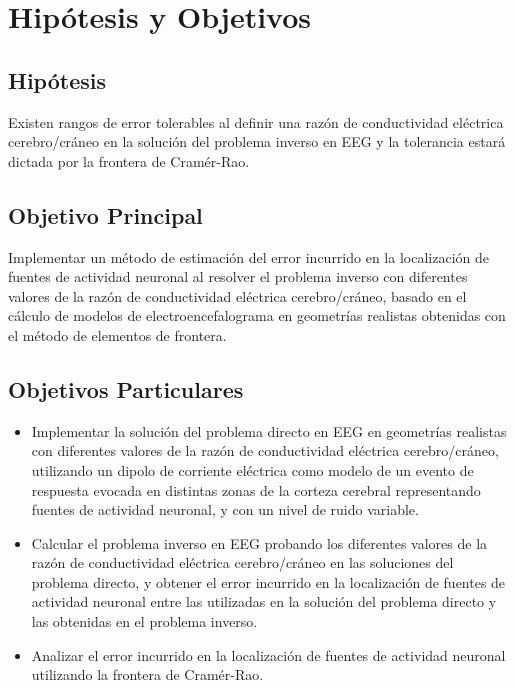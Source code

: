 %
\chapter{Hipótesis y Objetivos}
\label{sec:obj}

\section{Hipótesis}
\label{sec:obj:hipotesis}

Existen rangos de error tolerables al definir una razón de conductividad eléctrica cerebro/cráneo en la solución del problema inverso en EEG y la tolerancia estará dictada por la frontera de Cramér-Rao.

\section{Objetivo Principal}
\label{sec:obj:main}

Implementar un método de estimación del error incurrido en la localización de fuentes de actividad neuronal al resolver el problema inverso con diferentes valores de la razón de conductividad eléctrica cerebro/cráneo, basado en el cálculo de modelos de electroencefalograma en geometrías realistas obtenidas con el método de elementos de frontera.

\section{Objetivos Particulares}
\label{sec:obj:individual}

\begin{itemize}
	\item Implementar la solución del problema directo en EEG en geometrías realistas con diferentes valores de la razón de conductividad eléctrica cerebro/cráneo, utilizando un dipolo de corriente eléctrica como modelo de un evento de respuesta evocada en distintas zonas de la corteza cerebral representando fuentes de actividad neuronal, y con un nivel de ruido variable.
	\item Calcular el problema inverso en EEG probando los diferentes valores de la razón de conductividad eléctrica cerebro/cráneo en las soluciones del problema directo, y obtener el error incurrido en la localización de fuentes de actividad neuronal entre las utilizadas en la solución del problema directo y las obtenidas en el problema inverso.
	\item Analizar el error incurrido en la localización de fuentes de actividad neuronal utilizando la frontera de Cramér-Rao.
\end{itemize}
